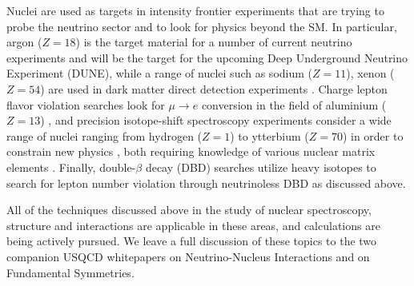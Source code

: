 Nuclei are used as targets in intensity frontier experiments that are trying to probe the neutrino sector and to look for physics beyond the SM. In particular, argon ($Z=18$) is the target material for a number of current neutrino experiments and will be the target for the upcoming Deep Underground Neutrino Experiment (DUNE), while a range of nuclei such as sodium ($Z=11$), xenon ($Z=54$) are used in dark matter direct detection experiments \cite{Undagoitia:2015gya}. Charge lepton flavor violation searches look for $\mu\to e$ conversion in the field of aluminium ($Z=13$) \cite{Albrecht:2013wet}, and precision isotope-shift spectroscopy experiments consider a wide range of nuclei ranging from hydrogen ($Z=1$) to ytterbium ($Z=70$) in  order to constrain new physics \cite{Delaunay:2016brc,Delaunay:2017dku}, both requiring knowledge of various nuclear matrix elements \cite{Chang:2017eiq}. Finally, double-$\beta$ decay (DBD) searches utilize heavy isotopes to search for lepton number violation through neutrinoless DBD \cite{DellOro:2016tmg,Engel:2016xgb} as discussed above.

All of the techniques discussed above in the study of nuclear spectroscopy, structure and interactions are applicable in these areas, and calculations are being actively pursued. We leave a full discussion of these topics to the two companion USQCD whitepapers on Neutrino-Nucleus Interactions and on Fundamental Symmetries.



